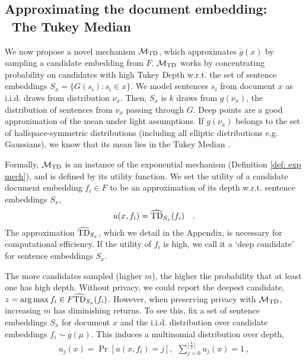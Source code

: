 \subsection{Approximating the document embedding:\\ \quad \quad \  The Tukey Median}
\label{sec:tukey}
We now propose a novel mechanism $\mathcal{M}_{\text{TD}}$, which approximates $\overline{g}(x)$ by sampling a candidate embedding from $F$. $\mathcal{M}_{\text{TD}}$ works by concentrating probability on candidates with high Tukey Depth w.r.t. the set of sentence embeddings $S_x = \{G(s_i) : s_i \in x\}$. We model sentences $s_i$ from document $x$ as i.i.d. draws from distribution $\nu_x$. Then, $S_x$ is $k$ draws from $g(\nu_x)$, the distribution of sentences from $\nu_x$ passing through $G$. Deep points are a good approximation of the mean under light assumptions. If $g(\nu_x)$ belongs to the set of halfspace-symmetric distributions (including all elliptic distributions e.g. Gaussians), we know that its mean lies in the Tukey Median \cite{tukey_props}. 

Formally, $\mathcal{M}_{\text{TD}}$ is an instance of the exponential mechanism (Definition \ref{def: exp mech}), and is defined by its utility function. We set the utility of a candidate document embedding $f_i \in F$ to be an approximation of its depth w.r.t. sentence embeddings $S_x$, 
\begin{align}
	u(x, f_i) = \widehat{\text{TD}}_{S_x}(f_i) \quad. 
	\label{eqn:utility}
\end{align}
The approximation $\widehat{\text{TD}}_{S_x}$, which we detail in the Appendix, is necessary for computational efficiency. If the utility of $f_i$ is high, we call it a `deep candidate' for sentence embeddings $S_x$.

The more candidates sampled (higher $m$), the higher the probability that at least one has high depth. Without privacy, we could report the deepest candidate, $z = \operatorname*{arg\,max}{f_i \in F} \widehat{\text{TD}}_{S_x}(f_i)$. However, when preserving privacy with $\mathcal{M}_{\text{TD}}$, increasing $m$ has diminishing returns. To see this, fix a set of sentence embeddings $S_x$ for document $x$ and the i.i.d. distribution over candidate embeddings $f_i \sim \overline{g}(\mu)$. This induces a multinomial distribution over depth,  
\vspace{-0.6cm}
\begin{align*}
	u_j(x) = \Pr[u(x, f_i) = j], \ \ \sum_{j = 0}^{\lfloor \frac{k}{2} \rfloor} u_j(x) = 1 \ ,
\end{align*}
\vspace{-0.5cm}

